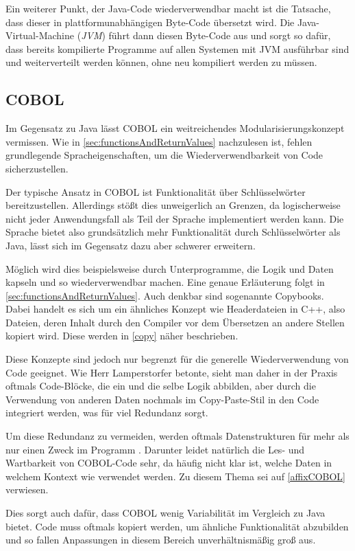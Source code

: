 Ein weiterer Punkt, der Java-Code wiederverwendbar macht ist die Tatsache, dass dieser in plattformunabhängigen Byte-Code übersetzt wird. Die Java-Virtual-Machine (\textit{JVM}) führt dann diesen Byte-Code aus und sorgt so dafür, dass bereits kompilierte Programme auf allen Systemen mit JVM ausführbar sind und weiterverteilt werden können, ohne neu kompiliert werden zu müssen.

\subsection*{COBOL}
Im Gegensatz zu Java lässt COBOL ein weitreichendes Modularisierungskonzept vermissen. Wie in \autoref{sec:functionsAndReturnValues} nachzulesen ist, fehlen grundlegende Spracheigenschaften, um die Wiederverwendbarkeit von Code sicherzustellen. 

Der typische Ansatz in COBOL ist Funktionalität über Schlüsselwörter bereitzustellen. Allerdings stößt dies unweigerlich an Grenzen, da logischerweise nicht jeder Anwendungsfall als Teil der Sprache implementiert werden kann. Die Sprache bietet also grundsätzlich mehr Funktionalität durch Schlüsselwörter als Java, lässt sich im Gegensatz dazu aber schwerer erweitern. 

Möglich wird dies beispielsweise durch Unterprogramme, die Logik und Daten kapseln und so wiederverwendbar machen. Eine genaue Erläuterung folgt in \autoref{sec:functionsAndReturnValues}. Auch denkbar sind sogenannte Copybooks. Dabei handelt es sich um ein ähnliches Konzept wie Headerdateien in C++, also Dateien, deren Inhalt durch den Compiler vor dem Übersetzen an andere Stellen kopiert wird. Diese werden in \autoref{copy} näher beschrieben.

Diese Konzepte sind jedoch nur begrenzt für die generelle Wiederverwendung von Code geeignet. Wie Herr Lamperstorfer betonte, sieht man daher in der Praxis oftmals Code-Blöcke, die ein und die selbe Logik abbilden, aber durch die Verwendung von anderen Daten nochmals im Copy-Paste-Stil in den Code integriert werden, was für viel Redundanz sorgt. 

Um diese Redundanz zu vermeiden, werden oftmals Datenstrukturen für mehr als nur einen Zweck im Programm . Darunter leidet natürlich die Les- und Wartbarkeit von COBOL-Code sehr, da häufig nicht klar ist, welche Daten in welchem Kontext wie verwendet werden. Zu diesem Thema sei auf \autoref{affixCOBOL} verwiesen.

Dies sorgt auch dafür, dass COBOL wenig Variabilität im Vergleich zu Java bietet. Code muss oftmals kopiert werden, um ähnliche Funktionalität abzubilden und so fallen Anpassungen in diesem Bereich unverhältnismäßig groß aus.

